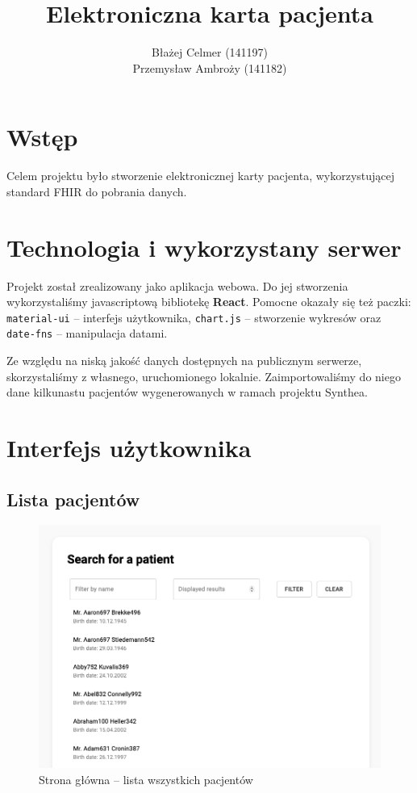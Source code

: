 \documentclass[polish,polish,a4paper]{article}
\title{Elektroniczna karta pacjenta}
\author{Błażej Celmer (141197)\\Przemysław Ambroży (141182)}
\begin{document}
 
	\maketitle
	
	\section{Wstęp}
		Celem projektu było stworzenie elektronicznej karty pacjenta, wykorzystującej standard FHIR do pobrania danych.
	
	\section{Technologia i wykorzystany serwer}
		Projekt został zrealizowany jako aplikacja webowa.
		Do jej stworzenia wykorzystaliśmy javascriptową bibliotekę \textbf{React}.
		Pomocne okazały się też paczki:  
		\texttt{material-ui} -- interfejs użytkownika,
		\texttt{chart.js} -- stworzenie wykresów oraz
		\texttt{date-fns} -- manipulacja datami.
		
		Ze względu na niską jakość danych dostępnych na publicznym serwerze,
		skorzystaliśmy z własnego, uruchomionego lokalnie.
		Zaimportowaliśmy do niego dane kilkunastu pacjentów wygenerowanych w ramach projektu Synthea.
	
	\section{Interfejs użytkownika}
	
	\subsection{Lista pacjentów}
	
	\begin{figure}[!h]
		\centering
		\includegraphics[width=.8\linewidth]{img/list1.png}
		\caption{Strona główna -- lista wszystkich pacjentów}
	\end{figure}
	
\end{document}
